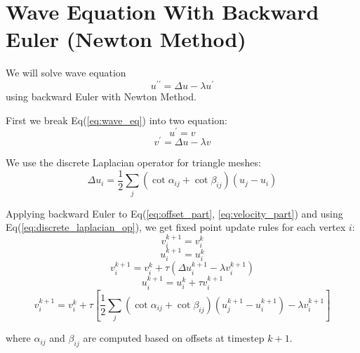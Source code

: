 \documentclass{article}
\begin{document}
\section*{Wave Equation With Backward Euler (Newton Method)}
We will solve wave equation 
\begin{equation} \label{eq:wave_eq}
u^{\prime\prime} = \Delta u - \lambda u^{\prime}
\end{equation}
using backward Euler with Newton Method.

First we break Eq(\ref{eq:wave_eq}) into two equation:
\begin{equation}\label{eq:offset_part}
u^{\prime} = v
\end{equation}
\begin{equation}\label{eq:velocity_part}
v^{\prime} = \Delta u - \lambda v
\end{equation}

We use the discrete Laplacian operator for triangle meshes:
\begin{equation} \label{eq:discrete_laplacian_op}
\Delta u_i = \frac{1}{2}\sum_{j} (\cot{\alpha_{ij}} + \cot{\beta_{ij}})(u_j - u_i)
\end{equation}

Applying backward Euler to Eq(\ref{eq:offset_part}, \ref{eq:velocity_part}) and using Eq(\ref{eq:discrete_laplacian_op}), we get fixed point update rules for each vertex $i$:
\begin{equation}\label{eq:initialization_velocity}
v_i^{k+1} = v_i^{k}
\end{equation}
\begin{equation}\label{eq:initialization_offset}
u_i^{k+1} = u_i^{k}
\end{equation}
\begin{equation}\label{eq:update_velocity}
v_i^{k+1} = v_i^{k} + \tau (\Delta u_i^{k+1} - \lambda v_i^{k+1})
\end{equation}
\begin{equation}\label{eq:update_offset}
u_i^{k+1} = u_i^{k} + \tau v_i^{k+1}
\end{equation}
\begin{equation}\label{eq:update_velocity_subs}
v_i^{k+1} = v_i^{k} + \tau \left[\frac{1}{2}\sum_{j} (\cot\alpha_{ij}+\cot\beta_{ij})(u_j^{k+1} - u_i^{k+1}) - \lambda v_i^{k+1}\right]
\end{equation}

where $\alpha_{ij}$ and $\beta_{ij}$ are computed based on offsets at timestep $k+1$.
\end{document}
